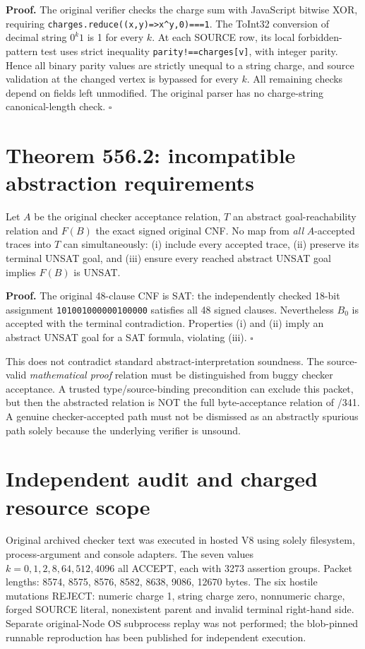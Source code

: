 \documentclass[11pt]{article}
\begin{document}
\noindent\textbf{Proof.} The original verifier checks the charge sum with JavaScript bitwise XOR, requiring \texttt{charges.reduce((x,y)=>x\^{}y,0)===1}. The ToInt32 conversion of decimal string $0^k1$ is 1 for every $k$. At each SOURCE row, its local forbidden-pattern test uses strict inequality \texttt{parity!==charges[v]}, with integer parity. Hence all binary parity values are strictly unequal to a string charge, and source validation at the changed vertex is bypassed for every $k$. All remaining checks depend on fields left unmodified. The original parser has no charge-string canonical-length check. $\square$

\section*{Theorem 556.2: incompatible abstraction requirements}
Let $A$ be the original checker acceptance relation, $T$ an abstract goal-reachability relation and $F(B)$ the exact signed original CNF. No map from \emph{all} $A$-accepted traces into $T$ can simultaneously: (i) include every accepted trace, (ii) preserve its terminal UNSAT goal, and (iii) ensure every reached abstract UNSAT goal implies $F(B)$ is UNSAT.

\noindent\textbf{Proof.} The original 48-clause CNF is SAT: the independently checked 18-bit assignment \texttt{101001000000100000} satisfies all 48 signed clauses. Nevertheless $B_0$ is accepted with the terminal contradiction. Properties (i) and (ii) imply an abstract UNSAT goal for a SAT formula, violating (iii). $\square$

This does not contradict standard abstract-interpretation soundness. The source-valid \emph{mathematical proof} relation must be distinguished from buggy checker acceptance. A trusted type/source-binding precondition can exclude this packet, but then the abstracted relation is NOT the full byte-acceptance relation of /341. A genuine checker-accepted path must not be dismissed as an abstractly spurious path solely because the underlying verifier is unsound.

\section*{Independent audit and charged resource scope}
Original archived checker text was executed in hosted V8 using solely filesystem, process-argument and console adapters. The seven values $k=0,1,2,8,64,512,4096$ all ACCEPT, each with 3273 assertion groups. Packet lengths: 8574, 8575, 8576, 8582, 8638, 9086, 12670 bytes. The six hostile mutations REJECT: numeric charge 1, string charge zero, nonnumeric charge, forged SOURCE literal, nonexistent parent and invalid terminal right-hand side. Separate original-Node OS subprocess replay was not performed; the blob-pinned runnable reproduction has been published for independent execution.
\end{document}
